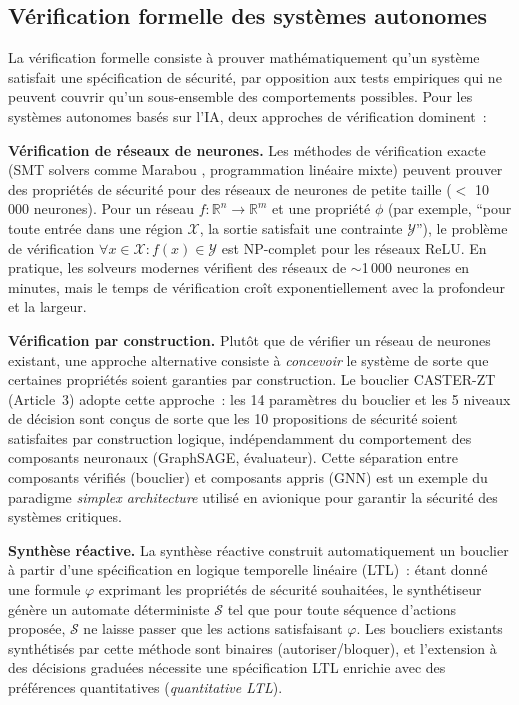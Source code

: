 \subsection{Vérification formelle des systèmes autonomes}

La vérification formelle consiste à prouver mathématiquement qu'un système satisfait une spécification de sécurité, par opposition aux tests empiriques qui ne peuvent couvrir qu'un sous-ensemble des comportements possibles. Pour les systèmes autonomes basés sur l'IA, deux approches de vérification dominent~:

\textbf{Vérification de réseaux de neurones.} Les méthodes de vérification exacte (SMT solvers comme Marabou \cite{katz2019marabou}, programmation linéaire mixte) peuvent prouver des propriétés de sécurité pour des réseaux de neurones de petite taille ($<$ 10\,000 neurones). Pour un réseau $f: \mathbb{R}^n \to \mathbb{R}^m$ et une propriété $\phi$ (par exemple, ``pour toute entrée dans une région $\mathcal{X}$, la sortie satisfait une contrainte $\mathcal{Y}$''), le problème de vérification $\forall x \in \mathcal{X}: f(x) \in \mathcal{Y}$ est NP-complet pour les réseaux ReLU. En pratique, les solveurs modernes vérifient des réseaux de $\sim$1\,000 neurones en minutes, mais le temps de vérification croît exponentiellement avec la profondeur et la largeur.

\textbf{Vérification par construction.} Plutôt que de vérifier un réseau de neurones existant, une approche alternative consiste à \emph{concevoir} le système de sorte que certaines propriétés soient garanties par construction. Le bouclier CASTER-ZT (Article~3) adopte cette approche~: les 14 paramètres du bouclier et les 5 niveaux de décision sont conçus de sorte que les 10 propositions de sécurité soient satisfaites par construction logique, indépendamment du comportement des composants neuronaux (GraphSAGE, évaluateur). Cette séparation entre composants vérifiés (bouclier) et composants appris (GNN) est un exemple du paradigme \emph{simplex architecture} utilisé en avionique pour garantir la sécurité des systèmes critiques.

\textbf{Synthèse réactive.} La synthèse réactive \cite{alshiekh2018shielding} construit automatiquement un bouclier à partir d'une spécification en logique temporelle linéaire (LTL)~: étant donné une formule $\varphi$ exprimant les propriétés de sécurité souhaitées, le synthétiseur génère un automate déterministe $\mathcal{S}$ tel que pour toute séquence d'actions proposée, $\mathcal{S}$ ne laisse passer que les actions satisfaisant $\varphi$. Les boucliers existants synthétisés par cette méthode sont binaires (autoriser/bloquer), et l'extension à des décisions graduées nécessite une spécification LTL enrichie avec des préférences quantitatives (\emph{quantitative LTL}).

